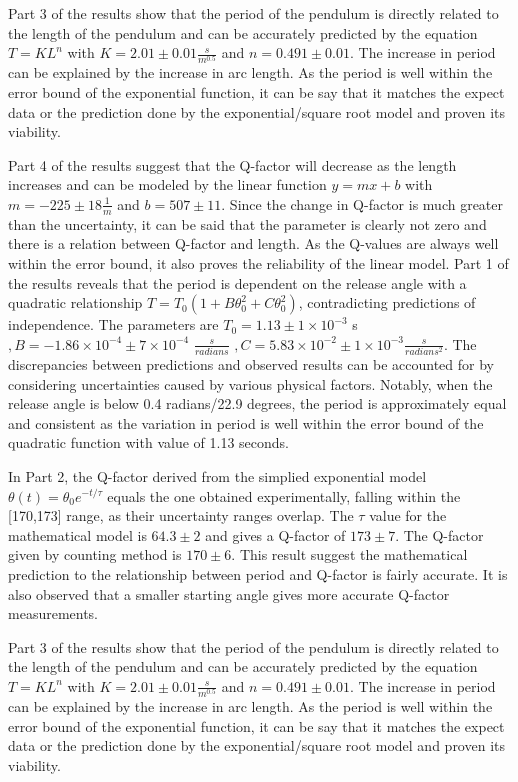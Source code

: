 \documentclass{article}
\begin{document}
Part 3 of the results show that the period of the pendulum is directly related to the length of the pendulum and can be accurately predicted by the equation $T = KL^n$ with $K = 2.01 \pm 0.01\frac{s}{m^{0.5}}$ and $n = 0.491 \pm 0.01$. The increase in period can be explained by the increase in arc length. As the period is well within the error bound of the exponential function, it can be say that it matches the expect data or the prediction done by the exponential/square root model and proven its viability. 

Part 4 of the results suggest that the Q-factor will decrease as the length increases and can be modeled by the linear function $y = mx + b$ with $m = -225 \pm 18\frac{1}{m}$ and $b = 507 \pm 11$. Since the change in Q-factor is much greater than the uncertainty, it can be said that the parameter is clearly not zero and there is a relation between Q-factor and length. As the Q-values are always well within the error bound, it also proves the reliability of the linear model.
Part 1 of the results reveals that the period is dependent on the release angle with a quadratic relationship $T = T_0(1 + B\theta_0^2 + C\theta_0^2)$, contradicting predictions of independence. The parameters are $T_0 = 1.13  \pm 1\times10^{-3} $ s $, B = -1.86\times10^{-4}  \pm 7\times10^{-4}$ $\frac{s}{radians}$ $, C = 5.83\times10^{-2} \pm 1\times10^{-3} \frac{s}{radians^2}$. The discrepancies between predictions and observed results can be accounted for by considering uncertainties caused by various physical factors. Notably, when the release angle is below 0.4 radians/22.9 degrees, the period is approximately equal and consistent as the variation in period is well within the error bound of the quadratic function with value of 1.13 seconds.

In Part 2, the Q-factor derived from the simplied exponential model $\theta(t) = \theta_0 e^{-t/\tau}$ equals the one obtained experimentally, falling within the [170,173] range, as their uncertainty ranges overlap. The $\tau$ value for the mathematical model  is $64.3 \pm 2$ and gives a Q-factor of $173 \pm 7$. The Q-factor given by counting method is $170 \pm 6$. This result suggest the mathematical prediction to the relationship between period and Q-factor is fairly accurate. It is also observed that a smaller starting angle gives more accurate Q-factor measurements.

Part 3 of the results show that the period of the pendulum is directly related to the length of the pendulum and can be accurately predicted by the equation $T = KL^n$ with $K = 2.01 \pm 0.01\frac{s}{m^{0.5}}$ and $n = 0.491 \pm 0.01$. The increase in period can be explained by the increase in arc length. As the period is well within the error bound of the exponential function, it can be say that it matches the expect data or the prediction done by the exponential/square root model and proven its viability. 
\end{document}
